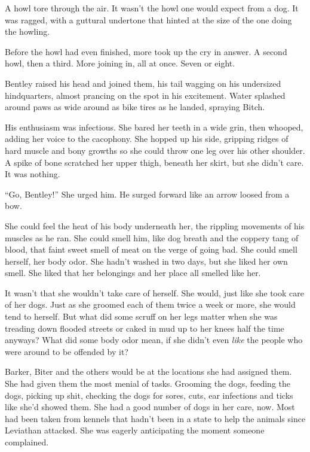 





A howl tore through the air.  It wasn't the howl one would expect from a dog.  It was ragged, with a guttural undertone that hinted at the size of the one doing the howling.



Before the howl had even finished, more took up the cry in answer.  A second howl, then a third.  More joining in, all at once.  Seven or eight.



Bentley raised his head and joined them, his tail wagging on his undersized hindquarters, almost prancing on the spot in his excitement.  Water splashed around paws as wide around as bike tires as he landed, spraying Bitch.



His enthusiasm was infectious.  She bared her teeth in a wide grin, then whooped, adding her voice to the cacophony.  She hopped up his side, gripping ridges of hard muscle and bony growths so she could throw one leg over his other shoulder.  A spike of bone scratched her upper thigh, beneath her skirt, but she didn't care.  It was nothing.



``Go, Bentley!'' She urged him.  He surged forward like an arrow loosed from a bow.



She could feel the heat of his body underneath her, the rippling movements of his muscles as he ran.  She could smell him, like dog breath and the coppery tang of blood, that faint sweet smell of meat on the verge of going bad.  She could smell herself, her body odor.  She hadn't washed in two days, but she liked her own smell.  She liked that her belongings and her place all smelled like her.



It wasn't that she wouldn't take care of herself.  She would, just like she took care of her dogs.  Just as she groomed each of them twice a week or more, she would tend to herself.  But what did some scruff on her legs matter when she was treading down flooded streets or caked in mud up to her knees half the time anyways?  What did some body odor mean, if she didn't even \emph{like} the people who were around to be offended by it?



Barker, Biter and the others would be at the locations she had assigned them.  She had given them the most menial of tasks.  Grooming the dogs, feeding the dogs, picking up shit, checking the dogs for sores, cuts, ear infections and ticks like she'd showed them.  She had a good number of dogs in her care, now.  Most had been taken from kennels that hadn't been in a state to help the animals since Leviathan attacked.  She was eagerly anticipating the moment someone complained.



